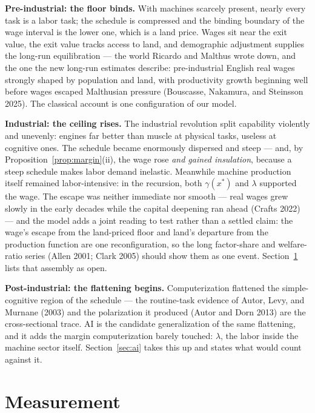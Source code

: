 \documentclass[12pt]{article}
\theoremstyle{plain}
\begin{document}
\textbf{Pre-industrial: the floor binds.} With machines scarcely present, nearly every task is a labor task; the schedule is compressed and the binding boundary of the wage interval is the lower one, which is a land price. Wages sit near the exit value, the exit value tracks access to land, and demographic adjustment supplies the long-run equilibration --- the world Ricardo and Malthus wrote down, and the one the new long-run estimates describe: pre-industrial English real wages strongly shaped by population and land, with productivity growth beginning well before wages escaped Malthusian pressure (Bouscasse, Nakamura, and Steinsson 2025). The classical account is one configuration of our model.

\textbf{Industrial: the ceiling rises.} The industrial revolution split capability violently and unevenly: engines far better than muscle at physical tasks, useless at cognitive ones. The schedule became enormously dispersed and steep --- and, by Proposition~\ref{prop:margin}(ii), the wage rose \emph{and gained insulation}, because a steep schedule makes labor demand inelastic. Meanwhile machine production itself remained labor-intensive: in the recursion, both $\gamma (x^*)$ and $\lambda$ supported the wage. The escape was neither immediate nor smooth --- real wages grew slowly in the early decades while the capital deepening ran ahead (Crafts 2022) --- and the model adds a joint reading to test rather than a settled claim: the wage's escape from the land-priced floor and land's departure from the production function are one reconfiguration, so the long factor-share and welfare-ratio series (Allen 2001; Clark 2005) should show them as one event. Section~\ref{sec:measurement} lists that assembly as open.

\textbf{Post-industrial: the flattening begins.} Computerization flattened the simple-cognitive region of the schedule --- the routine-task evidence of Autor, Levy, and Murnane (2003) and the polarization it produced (Autor and Dorn 2013) are the cross-sectional trace. AI is the candidate generalization of the same flattening, and it adds the margin computerization barely touched: $\lambda$, the labor inside the machine sector itself. Section~\ref{sec:ai} takes this up and states what would count against it.

\section{Measurement}\label{sec:measurement}
\end{document}
